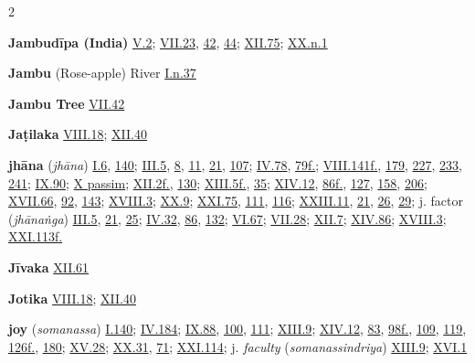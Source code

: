 \begin{multicols}{2}
\begin{vismHanging}
\par\textbf{Jambudīpa (India)} \hyperlink{V.2}{V.2}{}; \hyperlink{VII.23}{VII.23}{}, \hyperlink{VII.42}{42}{}, \hyperlink{VII.44}{44}{}; \hyperlink{XII.75}{XII.75}{}; \hyperlink{XX.n1}{XX.n.1}{}
\par\textbf{Jambu} (Rose-apple) River \hyperlink{I.n37}{I.n.37}{}
\par\textbf{Jambu Tree} \hyperlink{VII.42}{VII.42}{}
\par\textbf{Jaṭilaka} \hyperlink{VIII.18}{VIII.18}{}; \hyperlink{XII.40}{XII.40}{}
\par\textbf{jhāna} (\emph{jhāna}) \hyperlink{I.6}{I.6}{}, \hyperlink{I.140}{140}{}; \hyperlink{III.5}{III.5}{}, \hyperlink{III.8}{8}{}, \hyperlink{III.11}{11}{}, \hyperlink{III.21}{21}{}, \hyperlink{III.107}{107}{}; \hyperlink{IV.78}{IV.78}{}, \hyperlink{IV.79}{79f.}{}; \hyperlink{VIII.141}{VIII.141f.}{}, \hyperlink{VIII.179}{179}{}, \hyperlink{VIII.227}{227}{}, \hyperlink{VIII.233}{233}{}, \hyperlink{VIII.241}{241}{}; \hyperlink{IX.90}{IX.90}{}; \hyperlink{X}{X passim}{}; \hyperlink{XII.2}{XII.2f.}{}, \hyperlink{XII.130}{130}{}; \hyperlink{XIII.5}{XIII.5f.}{}, \hyperlink{XIII.35}{35}{}; \hyperlink{XIV.12}{XIV.12}{}, \hyperlink{XIV.86}{86f.}{}, \hyperlink{XIV.127}{127}{}, \hyperlink{XIV.158}{158}{}, \hyperlink{XIV.206}{206}{}; \hyperlink{XVII.66}{XVII.66}{}, \hyperlink{XVII.92}{92}{}, \hyperlink{XVII.143}{143}{}; \hyperlink{XVIII.3}{XVIII.3}{}; \hyperlink{XX.9}{XX.9}{}; \hyperlink{XXI.75}{XXI.75}{}, \hyperlink{XXI.111}{111}{}, \hyperlink{XXI.116}{116}{}; \hyperlink{XXIII.11}{XXIII.11}{}, \hyperlink{XXIII.21}{21}{}, \hyperlink{XXIII.26}{26}{}, \hyperlink{XXIII.29}{29}{}; j. factor (\emph{jhānaṅga}) \hyperlink{III.5}{III.5}{}, \hyperlink{III.21}{21}{}, \hyperlink{III.25}{25}{}; \hyperlink{IV.32}{IV.32}{}, \hyperlink{IV.86}{86}{}, \hyperlink{IV.132}{132}{}; \hyperlink{VI.67}{VI.67}{}; \hyperlink{VII.28}{VII.28}{}; \hyperlink{XII.7}{XII.7}{}; \hyperlink{XIV.86}{XIV.86}{}; \hyperlink{XVIII.3}{XVIII.3}{}; \hyperlink{XXI.113}{XXI.113f.}{}
\par\textbf{Jīvaka} \hyperlink{XII.61}{XII.61}{}
\par\textbf{Jotika} \hyperlink{VIII.18}{VIII.18}{}; \hyperlink{XII.40}{XII.40}{}
\par\textbf{joy} (\emph{somanassa}) \hyperlink{I.140}{I.140}{}; \hyperlink{IV.184}{IV.184}{}; \hyperlink{IX.88}{IX.88}{}, \hyperlink{IX.100}{100}{}, \hyperlink{IX.111}{111}{}; \hyperlink{XIII.9}{XIII.9}{}; \hyperlink{XIV.12}{XIV.12}{}, \hyperlink{XIV.83}{83}{}, \hyperlink{XIV.98}{98f.}{}, \hyperlink{XIV.109}{109}{}, \hyperlink{XIV.119}{119}{}, \hyperlink{XIV.126}{126f.}{}, \hyperlink{XIV.180}{180}{}; \hyperlink{XV.28}{XV.28}{}; \hyperlink{XX.31}{XX.31}{}, \hyperlink{XX.71}{71}{}; \hyperlink{XXI.114}{XXI.114}{}; j. \emph{faculty }(\emph{somanassindriya}) \hyperlink{XIII.9}{XIII.9}{}; \hyperlink{XVI.1}{XVI.1}{}

\end{vismHanging}
\end{multicols}
